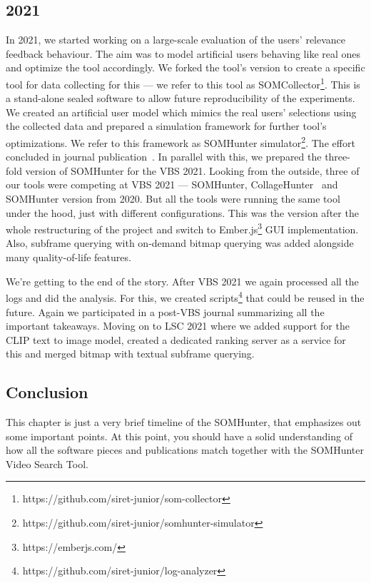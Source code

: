 \subsection{2021}
In 2021, we started working on a large-scale evaluation of the users' relevance feedback behaviour. The aim was to model artificial users behaving like real ones and optimize the tool accordingly. We forked the tool's version to create a specific tool for data collecting for this --- we refer to this tool as SOMCollector\footnote{https://github.com/siret-junior/som-collector}. This is a stand-alone sealed software to allow future reproducibility of the experiments. We created an artificial user model which mimics the real users' selections using the collected data and prepared a simulation framework for further tool's optimizations. We refer to this framework as SOMHunter simulator\footnote{https://github.com/siret-junior/somhunter-simulator}. The effort concluded in journal publication~\cite{journalRF}. In parallel with this, we prepared the three-fold version of SOMHunter for the VBS 2021. Looking from the outside, three of our tools were competing at VBS 2021 --- SOMHunter, CollageHunter~\cite{lokovc2021video} and SOMHunter version from 2020. But all the tools were running the same tool under the hood, just with different configurations. This was the version after the whole restructuring of the project and switch to Ember.js\footnote{https://emberjs.com/} GUI implementation. Also, subframe querying with on-demand bitmap querying was added alongside many quality-of-life features.

We're getting to the end of the story. After VBS 2021 we again processed all the logs and did the analysis. For this, we created scripts\footnote{https://github.com/siret-junior/log-analyzer} that could be reused in the future. Again we participated in a post-VBS journal summarizing all the important takeaways. Moving on to LSC 2021 where we added support for the CLIP text to image model, created a dedicated ranking server as a service for this and merged bitmap with textual subframe querying. 

\subsection{Conclusion}
This chapter is just a very brief timeline of the SOMHunter, that emphasizes out some important points. At this point, you should have a solid understanding of how all the software pieces and publications match together with the SOMHunter Video Search Tool.


